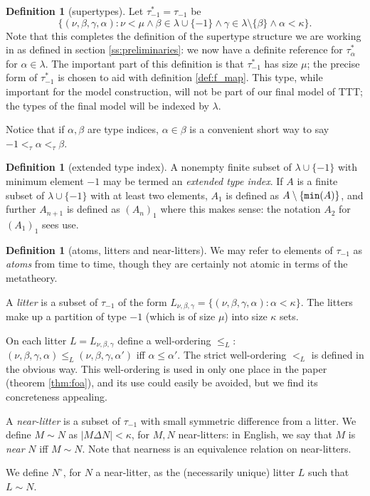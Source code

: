 \documentclass{article}
\theoremstyle{definition}
\newtheorem{definition}[theorem]{Definition}
\theoremstyle{remark}
\begin{document}
\begin{definition}[supertypes]\label{def:supertypes}
Let $\tau^*_{-1}=\tau_{-1}$ be $$\{(\nu,\beta,\gamma,\alpha):\nu<\mu \wedge  \beta \in \lambda\cup \{-1\} \wedge \gamma \in \lambda \setminus \{\beta\}\wedge \alpha<\kappa\}.$$  Note that this completes the definition of the supertype structure we are working in as defined in section \ref{ss:preliminaries}:  we now have a definite reference
for $\tau^*_\alpha$ for $\alpha\in \lambda$.
The important part of this definition is that $\tau_{-1}^*$ has size $\mu$; the precise form of $\tau_{-1}^*$ is chosen to aid with definition \ref{def:f_map}. This type, while important for the model construction, will not be part of our final model of TTT; the types of the final model  will be indexed by $\lambda$.
\end{definition}

Notice that if $\alpha,\beta$ are type indices, $\alpha\in \beta$ is a convenient short way to say $-1 <_\tau \alpha <_\tau \beta$.

\begin{definition}[extended type index]\label{def:extended_type_index}
A nonempty finite subset of $\lambda \cup \{-1\}$ {with minimum element $-1$} may be termed an {\em extended type index}.  If $A$ is a finite subset of $\lambda\cup \{-1\}$  with at least two elements, $A_1$ is defined as $A \setminus \{{\tt min}(A)\}$, and further $A_{n+1}$ is defined as $(A_n)_1$ where this makes sense:  the notation $A_2$ for $(A_1)_1$ sees use.
\end{definition}

\begin{definition}[atoms, litters and near-litters]\label{def:atom_litter_near_litter}
We may refer to elements of $\tau_{-1}$ as {\em atoms\/} from time to time, though they are certainly not atomic in terms of the metatheory.

A {\em litter\/} is a subset of $\tau_{-1}$ of the form $L_{\nu,\beta,\gamma} = \{(\nu,\beta,\gamma,\alpha):\alpha<\kappa\}$.  The litters make up a partition of type $-1$
(which is of size $\mu$) into size $\kappa$ sets.

On each litter $L =  L_{\nu,\beta,\gamma}$ define a well-ordering $\leq_L$:  $(\nu,\beta,\gamma,\alpha) \leq_L (\nu,\beta,\gamma,\alpha')$  iff $\alpha\leq \alpha'$.
The strict well-ordering $<_L$ is defined in the obvious way.  This well-ordering is used in only one place in the paper (theorem \ref{thm:foa}), and its use could easily be avoided, but we find its concreteness appealing.

A {\em near-litter\/} is a subset of $\tau_{-1}$ with small symmetric difference from a litter.  We define $M \sim N$ as $|M \Delta N|<\kappa$, for $M,N$ near-litters:  in English, we say that $M$ is {\em near\/} $N$ iff $M \sim N$.  Note that nearness is an equivalence relation on near-litters.

We define $N^\circ$, for $N$ a near-litter, as the (necessarily unique) litter $L$ such that $L \sim N$.
\end{definition}
\end{document}
